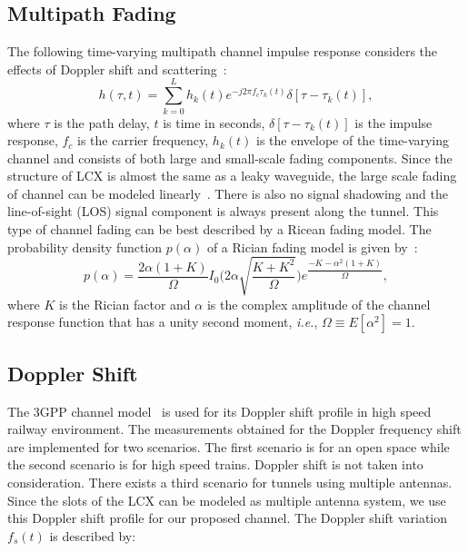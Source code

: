 \subsection{Multipath Fading}
The following time-varying multipath channel impulse response considers the effects of Doppler shift and scattering~\cite{booklter13}:
\begin{equation}
\label{channel}
{h}(\tau,t)= \sum_{k=0}^{L}{h_k}(t)e^{-j2\pi f_c\tau_k(t)}\delta[\tau-\tau_k(t)],
\end{equation}
where $\tau$ is the path delay, $t$ is time in seconds, $\delta[\tau-\tau_k(t)]$ is the impulse response, $f_c$ is the carrier frequency, $h_k(t)$ is the envelope of the time-varying channel and consists of both large and small-scale fading components. Since the structure of LCX is almost the same as a leaky waveguide, the large scale fading of channel can be modeled linearly~\cite{arlter10}. There is also no signal shadowing and the line-of-sight (LOS) signal component is always present along the tunnel. This type of channel fading can be best described by a Ricean fading model. The probability density function $p(\alpha)$ of a Rician fading model is given by~\cite{inplter12}:
\begin{equation}
p(\alpha) = \dfrac{2\alpha(1+K)}{\Omega}I_0\Bigg(2\alpha\sqrt{\dfrac{K+K^2}{\Omega}}\Bigg)e^{\dfrac{-K-\alpha^2(1+K)}{\Omega}},
\end{equation}
where $K$ is the Rician factor and $\alpha$ is the complex amplitude of the channel response function that has a unity second moment, \textit{i.e.}, $\Omega \equiv E[\alpha^2] = 1$.

\subsection{Doppler Shift}
The 3GPP channel model~\cite{trlter14} is used for its Doppler shift profile in high speed railway environment. The measurements obtained for the Doppler frequency shift are implemented for two scenarios. The first scenario is for an open space while the second scenario is for high speed trains. Doppler shift is not taken into consideration. There exists a third scenario for tunnels using multiple antennas. Since the slots of the LCX can be modeled as multiple antenna system, we use this Doppler shift profile for our proposed channel. The Doppler shift variation $f_s(t)$ is described by:

